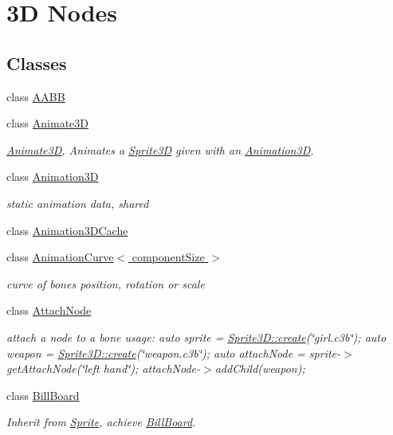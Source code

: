 \hypertarget{group____3d}{}\section{3D Nodes}
\label{group____3d}
\subsection*{Classes}
\begin{DoxyCompactItemize}
\item 
class \hyperlink{classAABB}{A\+A\+BB}
\item 
class \hyperlink{classAnimate3D}{Animate3D}
\begin{DoxyCompactList}\small\item\em \hyperlink{classAnimate3D}{Animate3D}, Animates a \hyperlink{classSprite3D}{Sprite3D} given with an \hyperlink{classAnimation3D}{Animation3D}. \end{DoxyCompactList}\item 
class \hyperlink{classAnimation3D}{Animation3D}
\begin{DoxyCompactList}\small\item\em static animation data, shared \end{DoxyCompactList}\item 
class \hyperlink{classAnimation3DCache}{Animation3\+D\+Cache}
\item 
class \hyperlink{classAnimationCurve}{Animation\+Curve$<$ component\+Size $>$}
\begin{DoxyCompactList}\small\item\em curve of bone\textquotesingle{}s position, rotation or scale \end{DoxyCompactList}\item 
class \hyperlink{classAttachNode}{Attach\+Node}
\begin{DoxyCompactList}\small\item\em attach a node to a bone usage\+: auto sprite = \hyperlink{classSprite3D_a10905e0480bfcf875882a9ad7b538d78}{Sprite3\+D\+::create}(\char`\"{}girl.\+c3b\char`\"{}); auto weapon = \hyperlink{classSprite3D_a10905e0480bfcf875882a9ad7b538d78}{Sprite3\+D\+::create}(\char`\"{}weapon.\+c3b\char`\"{}); auto attach\+Node = sprite-\/$>$get\+Attach\+Node(\char`\"{}left hand\char`\"{}); attach\+Node-\/$>$add\+Child(weapon); \end{DoxyCompactList}\item 
class \hyperlink{classBillBoard}{Bill\+Board}
\begin{DoxyCompactList}\small\item\em Inherit from \hyperlink{classSprite}{Sprite}, achieve \hyperlink{classBillBoard}{Bill\+Board}. \end{DoxyCompactList}\item 

\end{DoxyCompactItemize}
